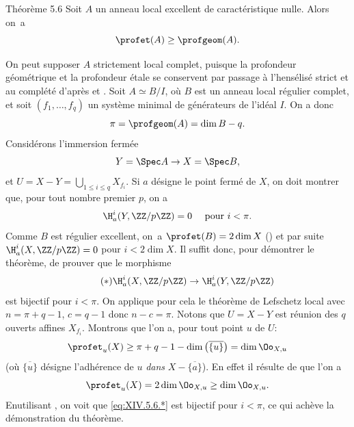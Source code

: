 \label{XIV.5.6}
\begin{enonce*}{Th\'eor\`eme 5.6\ndemark}
Soit $A$ un anneau local excellent de caract\'eristique nulle. Alors on~a
$$
\profet(A)\geq\profgeom(A).
$$
\end{enonce*}

On peut supposer $A$ strictement local complet, puisque la profondeur g\'eom\'etrique et la profondeur \'etale se conservent par passage \`a l'hens\'elis\'e strict et au compl\'et\'e d'apr\`es  et . Soit $A\simeq B/I$, o\`u $B$ est un anneau local r\'egulier complet, et soit $(f_{1},\dots, f_{q})$ un syst\`eme minimal de g\'en\'erateurs de l'id\'eal $I$. On a donc\pageoriginale
$$
\pi=\profgeom(A)=\dim B-q.
$$
Consid\'erons l'immersion ferm\'ee
$$Y=\Spec A\to X=\Spec B,
$$
et  $U=X-Y=\bigcup_{1\leq i\leq q}X_{f_{i}}$. Si $a$ d\'esigne le point ferm\'e de $X$, on doit montrer que, pour tout nombre premier $p$, on a
$$
\H_{a}^{i}(Y, \ZZ/p\ZZ)=0\quad\textrm{ pour }i<\pi.
$$
Comme $B$ est r\'egulier excellent, on~a $\profet(B)=2\dim X$ (\cf {}) et par suite $\H_{a}^{i}(X, \ZZ/p\ZZ)=0$ pour $i<2\dim X$. Il suffit donc, pour d\'emontrer le th\'eor\`eme, de prouver que le morphisme
\begin{equation*} \label{eq:XIV.5.6.*} \tag{$*$}
\H_{a}^{i}(X, \ZZ/p\ZZ)\to\H_{a}^{i}(Y, \ZZ/p\ZZ)
\end{equation*}
est bijectif pour $i<\pi$. On applique pour cela le th\'eor\`eme de Lefschetz local  avec $n=\pi+q-1$, $c=q-1$ donc $n-c=\pi$. Notons que $U=X-Y$ est r\'eunion des $q$ ouverts affines $X_{f_{i}}$. Montrons que l'on a, pour tout point $u$ de $U$:
$$
\profet_{u}(X)\geq\pi+q-1-\dim\big(\overline{\{ u\} }\big)=\dim\Oo_{X, u}$$
(o\`u $\overline{\{ u\} }$ d\'esigne l'adh\'erence de $u$ \emph{dans} $X-\overline{\{ a\} }$). En effet il r\'esulte de  que l'on a
$$
\profet_{u}(X)=2\dim\Oo_{X, u}\geq\dim\Oo_{X, u}.
$$
En\pageoriginaled utilisant , on voit que \eqref{eq:XIV.5.6.*} est bijectif pour $i<\pi$, ce qui ach\`eve la d\'emonstration du th\'eor\`eme.

